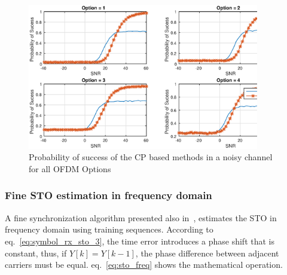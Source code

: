 
\begin{figure}[hbt]
  \centering
    \includegraphics[width=0.9\textwidth]
      {./figures/p_sucess_sto_cps}
  \caption{Probability of success of the CP based methods in a noisy channel for all OFDM Options}
  \label{fig:sto_esti_cp_prob_diff_acf}
\end{figure}





\subsubsection{Fine STO estimation in frequency domain}
A fine synchronization algorithm presented also in~\cite{cho2010mimo}, estimates the STO in frequency domain using training sequences. According to eq.~\ref{eq:symbol_rx_sto_3}, the time error introduces a phase shift that is constant, thus, if $Y[k]=Y[k-1]$, the phase difference between adjacent carriers must be equal. eq.~\ref{eq:sto_freq} shows the mathematical operation. 

